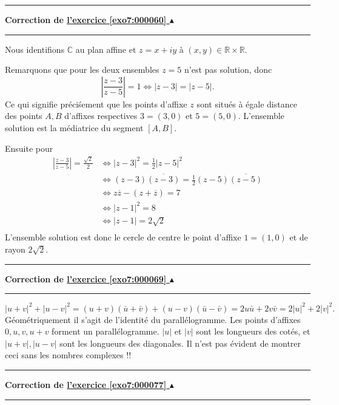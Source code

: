 \documentclass[11pt,a4paper]{article}
\newcommand{\Rr}{\mathbb{R}} \newcommand{\R}{\mathbb{R}}
\newcommand{\Cc}{\mathbb{C}} \newcommand{\C}{\mathbb{C}}
\newcounter{exo}
\newcommand{\correction}[1]{\hypertarget{cor7:#1}{}\label{cor7:#1}{\bf Correction de \hyperlink{exo7:#1}{l'exercice \ref{exo7:#1} $\blacktriangle$}}\vspace{1mm}\hrule\vspace{1mm}}
\newcommand{\fincorrection}{\vspace{1mm}\hrule\vspace*{7mm}}
\begin{document}
\fincorrection
\correction{000060}
Nous identifions $\Cc$ au plan affine et $z=x+iy$ \`a  $(x,y) \in
\Rr\times \Rr$.

Remarquons que pour les deux ensembles $z=5$ n'est pas solution,
donc
$$\left| \frac{z-3}{z-5} \right| = 1
\Leftrightarrow |z-3| = |z-5|.$$ Ce qui signifie pr\'eci\'sement que les
points d'affixe $z$ sont situ\'es \`a \'egale distance des points
$A,B$ d'affixes respectives $3 = (3,0)$ et $5=(5,0)$. L'ensemble
solution est la m\'ediatrice du segment $[A,B]$.

\bigskip

Ensuite pour
\begin{align*}
\left| \frac{z-3}{z-5} \right| = \frac{\sqrt{2}}{2}
&\Leftrightarrow |z-3|^2 = \frac{1}{2}|z-5|^2 \\
&\Leftrightarrow (z-3)\overline{(z-3)} = \frac{1}{2}(z-5)\overline{(z-5)}\\
&\Leftrightarrow z\overline{z}-(z+\overline{z})=7\\
&\Leftrightarrow |z-1|^2=8\\
&\Leftrightarrow |z-1|=2\sqrt{2}\\
\end{align*}
L'ensemble solution est donc le cercle de centre le point d'affixe
$1 = (1,0)$ et de rayon $2\sqrt{2}$.
\fincorrection
\correction{000069}
$$|u+v|^2+|u-v|^2=(u+v)(\bar u +\bar v) + (u-v)(\bar u -\bar v)
= 2u\bar u+2v\bar v = 2|u|^2+2|v|^2.$$
G\'eom\'etriquement il s'agit de l'identit\'e du parall\'elogramme.
Les points d'affixes $0,u,v,u+v$ forment un parall\'elogramme.
$|u|$ et $|v|$ sont les longueurs des cot\'es, et
$|u+v|, |u-v|$ sont les longueurs des diagonales.
Il n'est pas \'evident de montrer ceci sans les nombres complexes !!
\fincorrection
\correction{000077}
\end{document}
